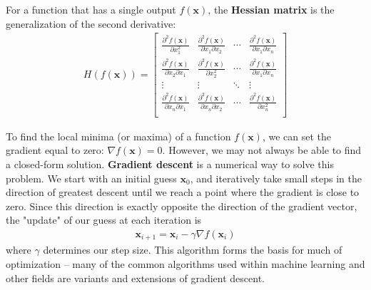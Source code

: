\documentclass[12pt,letterpaper]{article}
\newcommand{\p}{\partial}
\begin{document}
\noindent For a function that has a single output $f(\mathbf{x})$, the {\bf{Hessian matrix}} is the generalization of the second derivative:
\begin{align*}
H(f(\mathbf{x}))=\begin{bmatrix}
\frac{\p^2 f(\mathbf{x})}{\p x_1^2} & \frac{\p^2 f(\mathbf{x})}{\p x_1 \p x_2} & \cdots &  \frac{\p^2 f(\mathbf{x})}{\p x_1 \p x_n}\\
\frac{\p^2 f(\mathbf{x})}{\p x_2 \p x_1} & \frac{\p^2 f(\mathbf{x})}{\p x_2^2} & \cdots & \frac{\p^2 f(\mathbf{x})}{\p x_1 \p x_n}\\
\vdots & \vdots & \ddots & \vdots \\
\frac{\p^2 f(\mathbf{x})}{\p x_n \p x_1} & \frac{\p^2 f(\mathbf{x})}{\p x_n \p x_2} & \cdots & \frac{\p^2 f(\mathbf{x})}{\p x_n^2}\\
\end{bmatrix}
\end{align*}

\noindent To find the local minima (or maxima) of a function $f(\mathbf{x})$, we can set the gradient equal to zero: $\nabla f(\mathbf{x})=0$. However, we may not always be able to find a closed-form solution. {\bf{Gradient descent}} is a numerical way to solve this problem. We start with an initial guess $\mathbf{x}_0$, and iteratively take small steps in the direction of greatest descent until we reach a point where the gradient is close to zero. Since this direction is exactly opposite the direction of the gradient vector, the "update" of our guess at each iteration is
\begin{align*}
\mathbf{x}_{i+1} = \mathbf{x}_i - \gamma \nabla f(\mathbf{x}_i)
\end{align*}
where $\gamma$ determines our step size. This algorithm forms the basis for much of optimization -- many of the common algorithms used within machine learning and other fields are variants and extensions of gradient descent. \\

\end{document}
